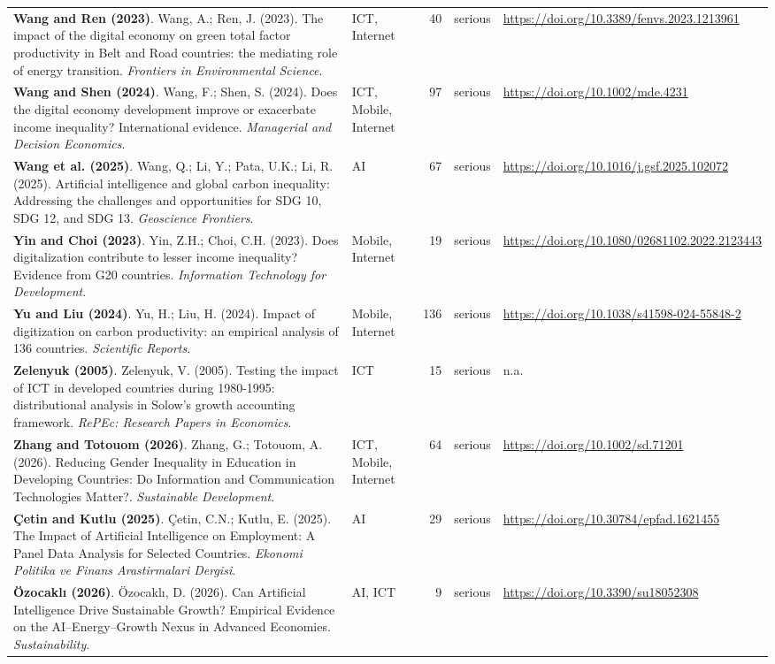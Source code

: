 {\begin{longtable}{@{}p{7.4cm} p{1.3cm} r l p{3.4cm}@{}}
\textbf{Wang and Ren (2023)}. Wang, A.; Ren, J. (2023). The impact of the digital economy on green total factor productivity in Belt and Road countries: the mediating role of energy transition. \emph{Frontiers in Environmental Science}. & ICT, Internet & 40 & serious & \url{https://doi.org/10.3389/fenvs.2023.1213961} \\
\textbf{Wang and Shen (2024)}. Wang, F.; Shen, S. (2024). Does the digital economy development improve or exacerbate income inequality? International evidence. \emph{Managerial and Decision Economics}. & ICT, Mobile, Internet & 97 & serious & \url{https://doi.org/10.1002/mde.4231} \\
\textbf{Wang et al. (2025)}. Wang, Q.; Li, Y.; Pata, U.K.; Li, R. (2025). Artificial intelligence and global carbon inequality: Addressing the challenges and opportunities for SDG 10, SDG 12, and SDG 13. \emph{Geoscience Frontiers}. & AI & 67 & serious & \url{https://doi.org/10.1016/j.gsf.2025.102072} \\
\textbf{Yin and Choi (2023)}. Yin, Z.H.; Choi, C.H. (2023). Does digitalization contribute to lesser income inequality? Evidence from G20 countries. \emph{Information Technology for Development}. & Mobile, Internet & 19 & serious & \url{https://doi.org/10.1080/02681102.2022.2123443} \\
\textbf{Yu and Liu (2024)}. Yu, H.; Liu, H. (2024). Impact of digitization on carbon productivity: an empirical analysis of 136 countries. \emph{Scientific Reports}. & Mobile, Internet & 136 & serious & \url{https://doi.org/10.1038/s41598-024-55848-2} \\
\textbf{Zelenyuk (2005)}. Zelenyuk, V. (2005). Testing the impact of ICT in developed countries during 1980-1995: distributional analysis in Solow’s growth accounting framework. \emph{RePEc: Research Papers in Economics}. & ICT & 15 & serious & n.a. \\
\textbf{Zhang and Totouom (2026)}. Zhang, G.; Totouom, A. (2026). Reducing Gender Inequality in Education in Developing Countries: Do Information and Communication Technologies Matter?. \emph{Sustainable Development}. & ICT, Mobile, Internet & 64 & serious & \url{https://doi.org/10.1002/sd.71201} \\
\textbf{Çetin and Kutlu (2025)}. Çetin, C.N.; Kutlu, E. (2025). The Impact of Artificial Intelligence on Employment: A Panel Data Analysis for Selected Countries. \emph{Ekonomi Politika ve Finans Arastirmalari Dergisi}. & AI & 29 & serious & \url{https://doi.org/10.30784/epfad.1621455} \\
\textbf{Özocaklı (2026)}. Özocaklı, D. (2026). Can Artificial Intelligence Drive Sustainable Growth? Empirical Evidence on the AI–Energy–Growth Nexus in Advanced Economies. \emph{Sustainability}. & AI, ICT & 9 & serious & \url{https://doi.org/10.3390/su18052308} \\
\end{longtable}
}
